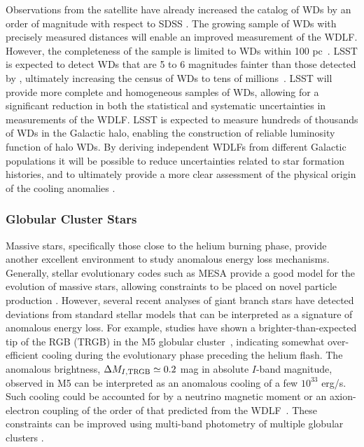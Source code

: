 Observations from the \Gaia satellite have already increased the catalog of WDs by an order of magnitude with respect to SDSS \citep{1805.01227,1807.03315,1807.02559}.
The growing sample of WDs with precisely measured distances will enable an improved measurement of the WDLF.  
However, the completeness of the \Gaia sample is limited to WDs within 100 pc~\citep{1807.03315}.
LSST is expected to detect WDs that are 5 to 6 magnitudes fainter than those detected by \Gaia, ultimately increasing the census of WDs to tens of millions~\citep{0912.0201}.
LSST will provide more complete and homogeneous samples of WDs, allowing for a significant reduction in both the statistical and systematic uncertainties in measurements of the WDLF. 
LSST is expected to measure hundreds of thousands of WDs in the Galactic halo, enabling the construction of reliable luminosity function of halo WDs. 
By deriving independent WDLFs from different Galactic populations it will be possible to reduce uncertainties related to star formation histories, and to ultimately provide a more clear assessment of the physical origin of the cooling anomalies \citep{Isern:2018uce}. 


\subsubsection{Globular Cluster Stars}


Massive stars, specifically those close to the helium burning phase, provide another excellent environment to study anomalous energy loss mechanisms. 
Generally, stellar evolutionary codes such as MESA \citep{1009.1622} provide a good model for the evolution of massive stars, allowing constraints to be placed on novel particle production \citep[\eg,][]{1210.1271,1611.05852}.
However, several recent analyses of giant branch stars have detected deviations from standard stellar models that can be interpreted as a signature of anomalous energy loss.
For example, studies have shown a brighter-than-expected tip of the RGB (TRGB) in the M5 globular cluster~\citep{Viaux:2013lha,Viaux:2013hca}, indicating somewhat over-efficient cooling during the evolutionary phase preceding the helium flash.
The anomalous brightness, $\Delta M_{I,{\rm TRGB}}\simeq 0.2$ mag in absolute $I$-band magnitude, observed in M5  can be interpreted as an anomalous cooling of a few $10^{33}$ erg/s.
Such cooling could be accounted for by a neutrino magnetic moment or an axion-electron coupling of the order of that predicted from the WDLF~\citep{Viaux:2013lha}. 
These constraints can be improved using multi-band photometry of multiple globular clusters \citep[\eg,][]{Straniero:2018fbv}.

